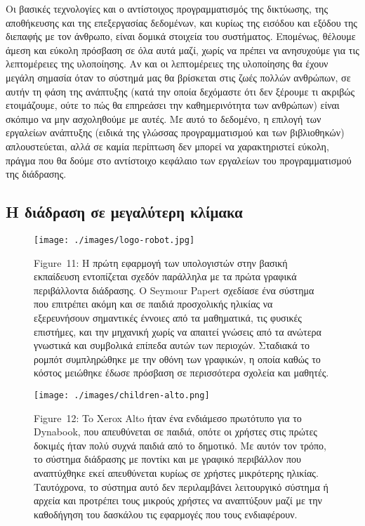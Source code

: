 \documentclass[
]{article}
\begin{document}
Οι βασικές τεχνολογίες και ο αντίστοιχος προγραμματισμός της δικτύωσης,
της αποθήκευσης και της επεξεργασίας δεδομένων, και κυρίως της εισόδου
και εξόδου της διεπαφής με τον άνθρωπο, είναι δομικά στοιχεία του
συστήματος. Επομένως, θέλουμε άμεση και εύκολη πρόσβαση σε όλα αυτά
μαζί, χωρίς να πρέπει να ανησυχούμε για τις λεπτομέρειες της υλοποίησης.
Αν και οι λεπτομέρειες της υλοποίησης θα έχουν μεγάλη σημασία όταν το
σύστημά μας θα βρίσκεται στις ζωές πολλών ανθρώπων, σε αυτήν τη φάση της
ανάπτυξης (κατά την οποία δεχόμαστε ότι δεν ξέρουμε τι ακριβώς
ετοιμάζουμε, ούτε το πώς θα επηρεάσει την καθημερινότητα των ανθρώπων)
είναι σκόπιμο να μην ασχοληθούμε με αυτές. Με αυτό το δεδομένο, η
επιλογή των εργαλείων ανάπτυξης (ειδικά της γλώσσας προγραμματισμού και
των βιβλιοθηκών) απλουστεύεται, αλλά σε καμία περίπτωση δεν μπορεί να
χαρακτηριστεί εύκολη, πράγμα που θα δούμε στο αντίστοιχο κεφάλαιο των
εργαλείων του προγραμματισμού της διάδρασης.

\hypertarget{ux3b7-ux3b4ux3b9ux3acux3b4ux3c1ux3b1ux3c3ux3b7-ux3c3ux3b5-ux3bcux3b5ux3b3ux3b1ux3bbux3cdux3c4ux3b5ux3c1ux3b7-ux3baux3bbux3afux3bcux3b1ux3baux3b1}{%
\subsection{Η διάδραση σε μεγαλύτερη
κλίμακα}\label{ux3b7-ux3b4ux3b9ux3acux3b4ux3c1ux3b1ux3c3ux3b7-ux3c3ux3b5-ux3bcux3b5ux3b3ux3b1ux3bbux3cdux3c4ux3b5ux3c1ux3b7-ux3baux3bbux3afux3bcux3b1ux3baux3b1}}

\leavevmode{}%
\begin{figure}
\hypertarget{fig:logo-robot}{%
\centering
\texttt{[image: ./images/logo-robot.jpg]}
\caption{Figure~11: Η πρώτη εφαρμογή των υπολογιστών στην βασική
εκπαίδευση εντοπίζεται σχεδόν παράλληλα με τα πρώτα γραφικά περιβάλλοντα
διάδρασης. Ο Seymour Papert σχεδίασε ένα σύστημα που επιτρέπει ακόμη και
σε παιδιά προσχολικής ηλικίας να εξερευνήσουν σημαντικές έννοιες από τα
μαθηματικά, τις φυσικές επιστήμες, και την μηχανική χωρίς να απαιτεί
γνώσεις από τα ανώτερα γνωστικά και συμβολικά επίπεδα αυτών των
περιοχών. Σταδιακά το ρομπότ συμπληρώθηκε με την οθόνη των γραφικών, η
οποία καθώς το κόστος μειώθηκε έδωσε πρόσβαση σε περισσότερα σχολεία και
μαθητές.}\label{fig:logo-robot}
}
\end{figure}

\leavevmode{}%
\begin{figure}
\hypertarget{fig:children-alto}{%
\centering
\texttt{[image: ./images/children-alto.png]}
\caption{Figure~12: To Xerox Alto ήταν ένα ενδιάμεσο πρωτότυπο για το
Dynabook, που απευθύνεται σε παιδιά, οπότε οι χρήστες στις πρώτες
δοκιμές ήταν πολύ συχνά παιδιά από το δημοτικό. Με αυτόν τον τρόπο, το
σύστημα διάδρασης με ποντίκι και με γραφικό περιβάλλον που αναπτύχθηκε
εκεί απευθύνεται κυρίως σε χρήστες μικρότερης ηλικίας. Ταυτόχρονα, το
σύστημα αυτό δεν περιλαμβάνει λειτουργικό σύστημα ή αρχεία και προτρέπει
τους μικρούς χρήστες να αναπτύξουν μαζί με την καθοδήγηση του δασκάλου
τις εφαρμογές που τους ενδιαφέρουν.}\label{fig:children-alto}
}
\end{figure}
\end{document}
